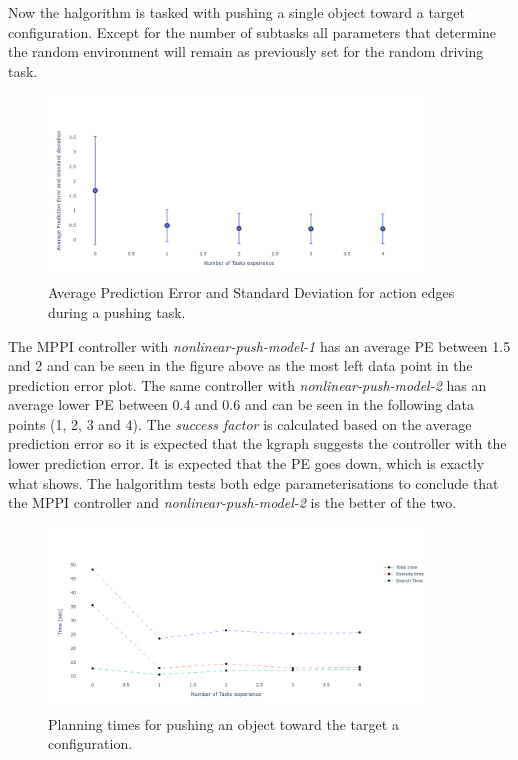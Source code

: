 Now the \ac{halgorithm} is tasked with pushing a single object toward a target configuration. Except for the number of subtasks all parameters that determine the random environment will remain as previously set for the random driving task.\bs

\begin{figure}[H]
    \centering
    \includegraphics[width=0.9\textwidth]{figures/results/rand_push_pred_error}
    \caption{Average Prediction Error and Standard Deviation for action edges during a pushing task.}%
    \label{fig:rand_push_full_pred}
\end{figure}

The \ac{MPPI} controller with \textit{nonlinear-push-model-1} has an average \ac{PE} between 1.5 and 2 and can be seen in the figure above as the most left data point in the prediction error plot. The same controller with \textit{nonlinear-push-model-2} has an average lower \ac{PE} between 0.4 and 0.6 and can be seen in the following data points (1, 2, 3 and 4). The \textit{success factor}  is calculated based on the average prediction error so it is expected that the \ac{kgraph} suggests the controller with the lower prediction error. It is expected that the \ac{PE} goes down, which is exactly what  shows. The \ac{halgorithm} tests both edge parameterisations to conclude that the \ac{MPPI} controller and \textit{nonlinear-push-model-2} is the better of the two.  

\begin{figure}[H]
    \centering
    \includegraphics[width=0.9\textwidth]{figures/results/random_push_execution_times}
    \caption{Planning times for pushing an object toward the target a configuration.}%
    \label{fig:random_push_all_times}
\end{figure}

